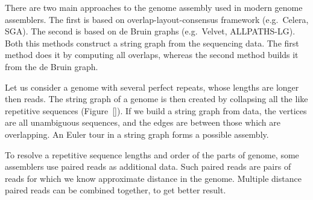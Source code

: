 There are two main approaches to the genome assembly used in modern genome assemblers. The first is based on overlap-layout-consensus framework (e.g.\ Celera\cite{myers2000celera}, SGA\cite{simpson2010sga}). The second is based on de Bruin graphs (e.g.\ Velvet\cite{zerbino2008velvet}, ALLPATHS-LG\cite{gnerre2011allpaths}). Both this methods construct a string graph\cite{myers2005stringgraph} from the sequencing data. The first method does it by computing all overlaps, whereas the second method builds it from the de Bruin graph.

Let us consider a genome with several perfect repeats, whose lengths are longer then reads. The string graph of a genome is then created by collapsing all the like repetitive sequences (Figure~\ref{}). If we build a string graph from data, the vertices are all unambiguous sequences, and the edges are between those which are overlapping. An Euler tour in a string graph forms a possible assembly.

To resolve a repetitive sequence lengths and order of the parts of genome, some assemblers use paired reads as additional data. Such paired reads are pairs of reads for which we know approximate distance in the genome. Multiple distance paired reads can be combined together, to get better result.

